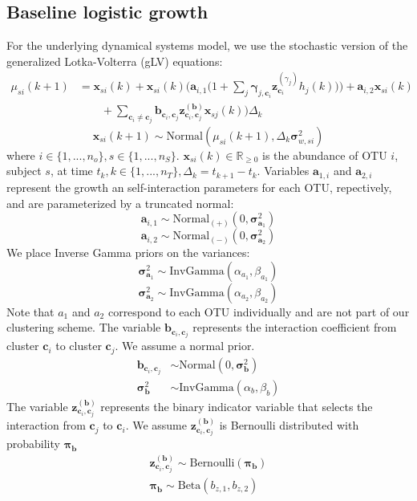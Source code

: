 \documentclass{article}
\newcommand{\R}{\mathbb{R}}
\newcommand{\Normaldist}{\text{Normal}}
\newcommand{\InvGammadist}{\text{InvGamma}}
\newcommand{\Betadist}{\text{Beta}}
\newcommand{\Bernoullidist}{\text{Bernoulli}}
\renewcommand{\c}{\mathbf{c}}
\renewcommand{\a}[2]{\mathbf{a}_{#1,#2}}
\newcommand{\vara}[1]{\mathbf{\sigma}^2_{\mathbf{a}_#1}}
\newcommand{\bc}[2]{\mathbf{b}_{\c_{#1},\c_{#2}}}
\newcommand{\zbc}[2]{\mathbf{z}^{(\mathbf{b})}_{\c_{#1},\c_{#2}}}
\newcommand{\probb}{\mathbf{\pi}_{\mathbf{b}}}
\newcommand{\varb}{\mathbf{\sigma}^2_{\mathbf{b}}}
\newcommand{\pertc}[1]{\mathbf{\gamma}_{j,\c_{#1}}}
\newcommand{\zpertc}[1]{\mathbf{z}^{(\gamma_j)}_{\c_{#1}}}
\newcommand{\pertstep}{h_j}
\newcommand{\x}[2]{\mathbf{x}_{#2}(#1)}
\newcommand{\varw}[1]{\mathbf{\sigma}^2_{w,{}#1}}
\newcommand{\dt}{\Delta_{k}}
\begin{document}
\subsection{Baseline logistic growth}
For the underlying dynamical systems model, we use the stochastic version of the generalized Lotka-Volterra (gLV) equations:
\begin{align}
  \label{eqn:mean logisitc growth}
  \mu_{si}(k+1) & = \x{k}{si} + \x{k}{si} \Big(
    \a{i}{1} \Big(
      1 + \sum_j \pertc{i} \zpertc{i} \pertstep(k)
    \Big)
    \Big) + \a{i}{2} \x{k}{si} \\
    & \quad \quad + \sum_{\c_i \neq \c_j}
    \bc{i}{j}\zbc{i}{j}\x{k}{sj} \nonumber
   \Big) \dt
\end{align}
\begin{equation}
  \x{k+1}{si} \sim \Normaldist(\mu_{si}(k+1), \dt \varw{si})
\end{equation}
where $i \in \{1,...,n_o\}, s \in \{ 1,...,n_S \}$. $\x{k}{si} \in \R_{\ge 0}$ is the abundance of OTU $i$, subject $s$, at time $t_k, k \in \{1,...,n_T\}, \dt = t_{k+1}-t_k$. Variables $\a{1}{i}$ and $\a{2}{i}$ represent the growth an self-interaction parameters for each OTU, repectively, and are parameterized by a truncated normal:
\begin{equation}
  \a{i}{1} \sim \Normaldist_{(+)}(0,\vara{1})
\end{equation}
\begin{equation}
  \a{i}{2} \sim \Normaldist_{(-)}(0,\vara{2})
\end{equation}
We place Inverse Gamma priors on the variances:
\begin{equation}
  \vara{1} \sim \InvGammadist(\alpha_{a_1},\beta_{a_1})
\end{equation}
\begin{equation}
  \vara{2} \sim \InvGammadist(\alpha_{a_2},\beta_{a_2})
\end{equation}
Note that $a_1$ and $a_2$ correspond to each OTU individually and are not part of our clustering scheme.
The variable $\bc{i}{j}$ represents the interaction coefficient from cluster $\c_i$ to cluster $\c_j$. We assume a normal prior.
\begin{align}
  \bc{i}{j} & \sim \Normaldist (0, \varb ) \\
  \varb & \sim \InvGammadist (\alpha_{b}, \beta_{b})
\end{align}
The variable $\zbc{i}{j}$ represents the binary indicator variable that selects the interaction from $\c_j$ to $\c_i$. We assume $\zbc{i}{j}$ is Bernoulli distributed with probability $\probb$
\begin{align}
  \zbc{i}{j} \sim \Bernoullidist (\probb) \\
  \probb \sim \Betadist (b_{z,1}, b_{z,2})
\end{align}
\end{document}
